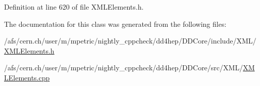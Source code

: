Definition at line 620 of file X\+M\+L\+Elements.\+h.



The documentation for this class was generated from the following files\+:\begin{DoxyCompactItemize}
\item 
/afs/cern.\+ch/user/m/mpetric/nightly\+\_\+cppcheck/dd4hep/\+D\+D\+Core/include/\+X\+M\+L/\hyperlink{_x_m_l_elements_8h}{X\+M\+L\+Elements.\+h}\item 
/afs/cern.\+ch/user/m/mpetric/nightly\+\_\+cppcheck/dd4hep/\+D\+D\+Core/src/\+X\+M\+L/\hyperlink{_x_m_l_elements_8cpp}{X\+M\+L\+Elements.\+cpp}\end{DoxyCompactItemize}
